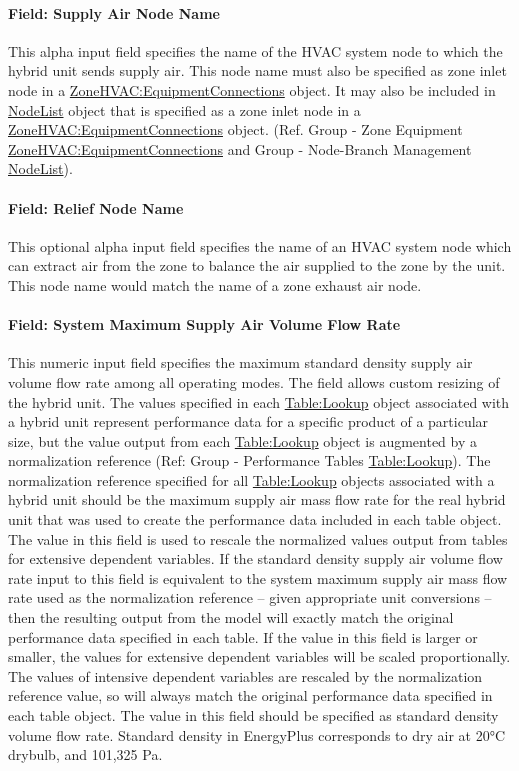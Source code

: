 \paragraph{Field: Supply Air Node Name}
This alpha input field specifies the name of the HVAC system node to which the hybrid unit sends supply air. This node name must also be specified as zone inlet node in a \hyperref[zonehvacequipmentconnections]{ZoneHVAC:EquipmentConnections} object. It may also be included in \hyperref[nodelist]{NodeList} object that is specified as a zone inlet node in a \hyperref[zonehvacequipmentconnections]{ZoneHVAC:EquipmentConnections} object. (Ref. Group - Zone Equipment \hyperref[zonehvacequipmentconnections]{ZoneHVAC:EquipmentConnections} and Group - Node-Branch Management \hyperref[nodelist]{NodeList}).

\paragraph{Field: Relief Node Name}
This optional alpha input field specifies the name of an HVAC system node which can extract air from the zone to balance the air supplied to the zone by the unit. This node name would match the name of a zone exhaust air node.

\paragraph{Field: System Maximum Supply Air Volume Flow Rate}
This numeric input field specifies the maximum standard density supply air volume flow rate among all operating modes. The field allows custom resizing of the hybrid unit. The values specified in each \hyperref[tablelookup]{Table:Lookup} object associated with a hybrid unit represent performance data for a specific product of a particular size, but the value output from each \hyperref[tablelookup]{Table:Lookup} object is augmented by a normalization reference (Ref: Group - Performance Tables \hyperref[tablelookup]{Table:Lookup}). The normalization reference specified for all \hyperref[tablelookup]{Table:Lookup} objects associated with a hybrid unit should be the maximum supply air mass flow rate for the real hybrid unit that was used to create the performance data included in each table object. The value in this field is used to rescale the normalized values output from tables for extensive dependent variables. If the standard density supply air volume flow rate input to this field is equivalent to the system maximum supply air mass flow rate used as the normalization reference – given appropriate unit conversions – then the resulting output from the model will exactly match the original performance data specified in each table. If the value in this field is larger or smaller, the values for extensive dependent variables will be scaled proportionally. The values of intensive dependent variables are rescaled by the normalization reference value, so will always match the original performance data specified in each table object. The value in this field should be specified as standard density volume flow rate. Standard density in EnergyPlus corresponds to dry air at 20\si{\degreeCelsius} drybulb, and 101,325 Pa.

